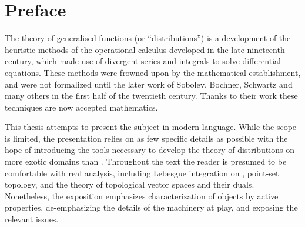 \chapter*{Preface}
  The theory of generalised functions (or ``distributions'') is a development of the heuristic methods of the operational calculus developed in the late nineteenth century, which made use of divergent series and integrals to solve differential equations.
  These methods were frowned upon by the mathematical establishment, and were not formalized until the later work of Sobolev, Bochner, Schwartz and many others in the first half of the twentieth century.
  Thanks to their work these techniques are now accepted mathematics.

  This thesis attempts to present the subject in modern language.
  While the scope is limited, the presentation relies on as few specific details as possible with the hope of introducing the tools necessary to develop the theory of distributions on more exotic domains than \R.
  Throughout the text the reader is presumed to be comfortable with real analysis, including Lebesgue integration on \R, point-set topology, and the theory of topological vector spaces and their duals.
  Nonetheless, the exposition emphasizes characterization of objects by active properties, de-emphasizing the details of the machinery at play, and exposing the relevant issues.
